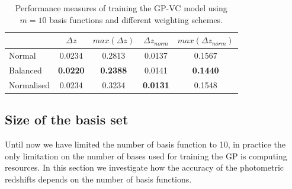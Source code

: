 \documentclass[useAMS,usenatbib,fleqn]{mn2e}
\begin{document}
 \begin{table}
\caption{Performance measures of training the GP-VC model using $m=10$ basis functions and different weighting schemes.}
\begin{center}
  \begin{tabular}{| l | c | c | c | c |}
     				&	$\Delta z$	&	$max\left(\Delta z\right)$		&	$\Delta z_{norm}$		&	$max\left(\Delta z_{norm}\right)$	\\	\hline
	Normal		&	0.0234		&	0.2813			&	0.0137				&	0.1567				\\
	Balanced		&	\textbf{0.0220}	&	\textbf{0.2388}		&	0.0141				&	\textbf{0.1440}			\\
	Normalised	&	0.0234		&	0.3234			&	\textbf{0.0131}			&	0.1548				\\	\hline
  \end{tabular}
\end{center}
\label{table-normal-balanced}
\end{table}

\subsection{Size of the basis set}
Until now we have limited the number of basis function to 10, in practice the only limitation on the number of bases used for training the GP is computing resources. In this section we investigate how the accuracy of the photometric redshifts depends on the number of basis functions.
\end{document}
